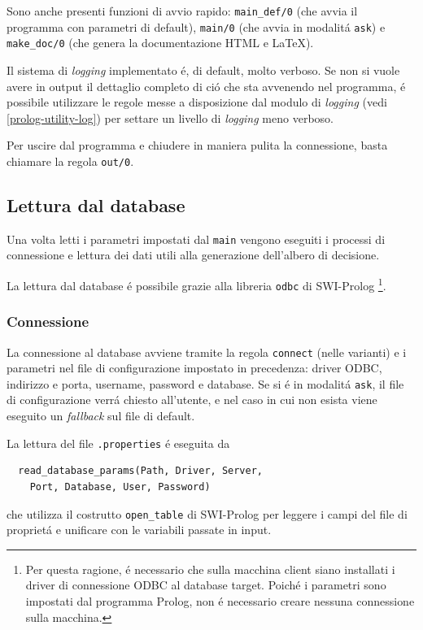 \documentclass[preprint]{acm_proc_article-sp}
\begin{document}
Sono anche presenti funzioni di avvio rapido: \verb|main_def/0| (che avvia il programma con parametri di default), \verb|main/0| (che avvia in modalit\'a \verb|ask|) e \verb|make_doc/0| (che genera la documentazione HTML e \LaTeX).

Il sistema di \textit{logging} implementato \'e, di default, molto verboso. Se non si vuole avere in output il dettaglio completo di ci\'o che sta avvenendo nel programma, \'e possibile utilizzare le regole messe a disposizione dal modulo di \textit{logging} (vedi \ref{prolog-utility-log}) per settare un livello di \textit{logging} meno verboso.

Per uscire dal programma e chiudere in maniera pulita la connessione, basta chiamare la regola \verb|out/0|.

\subsection{Lettura dal database}
\label{prolog-database}
Una volta letti i parametri impostati dal \verb|main| vengono eseguiti i processi di connessione e lettura dei dati utili alla generazione dell'albero di decisione.

La lettura dal database \'e possibile grazie alla libreria \verb|odbc| di SWI-Prolog \footnote{Per questa ragione, \'e necessario che sulla macchina client siano installati i driver di connessione ODBC al database target. Poich\'e i parametri sono impostati dal programma Prolog, non \'e necessario creare nessuna connessione sulla macchina.}.

\subsubsection{Connessione}
La connessione al database avviene tramite la regola \verb|connect| (nelle varianti) e i parametri nel file di configurazione impostato in precedenza: driver ODBC, indirizzo e porta, username, password e database. Se si \'e in modalit\'a \verb|ask|, il file di configurazione verr\'a chiesto all'utente, e nel caso in cui non esista viene eseguito un \textit{fallback} sul file di default.

La lettura del file \verb|.properties| \'e eseguita da
\begin{verbatim}
  read_database_params(Path, Driver, Server, 
  	Port, Database, User, Password)
\end{verbatim}
che utilizza il costrutto \verb|open_table| di SWI-Prolog per leggere i campi del file di propriet\'a e unificare con le variabili passate in input.
\end{document}
